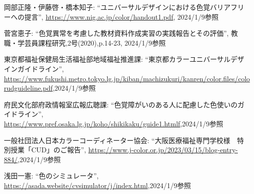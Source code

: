 \begin{thebibliography}{99}

岡部正隆・伊藤啓・橋本知子: ``ユニバーサルデザインにおける色覚バリアフリーへの提言'', \url{https://www.nig.ac.jp/color/handout1.pdf}, 2024/1/9参照

 菅宮恵子: ``色覚異常を考慮した教材資料作成実習の実践報告とその評価'', 教職・学芸員課程研究,2号(2020),p.14-23, 2024/1/9参照

 東京都福祉保健局生活福祉部地域福祉推進課: ``東京都カラーユニバーサルデザインガイドライン'', \url{https://www.fukushi.metro.tokyo.lg.jp/kiban/machizukuri/kanren/color.files/colorudguideline.pdf},2024/1/9参照

 府民文化部府政情報室広報広聴課: ``色覚障がいのある人に配慮した色使いのガイドライン'', \url{https://www.pref.osaka.lg.jp/koho/shikikaku/guide1.htmlf},2024/1/9参照

 一般社団法人日本カラーコーディネーター協会: ``大阪医療福祉専門学校様　特別授業「CUD」のご報告'', \url{https://www.j-color.or.jp/2023/03/15/blog-entry-884/},2024/1/9参照

浅田一憲: ``色のシミュレータ'', \url{https://asada.website/cvsimulator/j/index.html},2024/1/9参照




\end{thebibliography}
